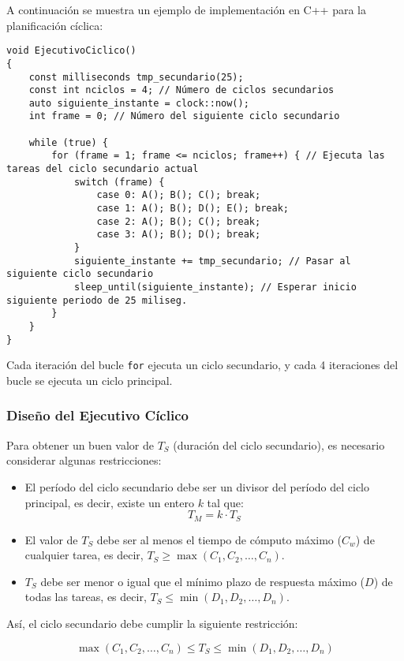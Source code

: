 \documentclass[a4paper,12pt]{article}
\begin{document}
A continuación se muestra un ejemplo de implementación en C++ para la planificación cíclica:

\begin{lstlisting}[style=customcpp]
void EjecutivoCiclico()
{
    const milliseconds tmp_secundario(25);
    const int nciclos = 4; // Número de ciclos secundarios
    auto siguiente_instante = clock::now();
    int frame = 0; // Número del siguiente ciclo secundario

    while (true) {
        for (frame = 1; frame <= nciclos; frame++) { // Ejecuta las tareas del ciclo secundario actual
            switch (frame) {
                case 0: A(); B(); C(); break;
                case 1: A(); B(); D(); E(); break;
                case 2: A(); B(); C(); break;
                case 3: A(); B(); D(); break;
            }
            siguiente_instante += tmp_secundario; // Pasar al siguiente ciclo secundario
            sleep_until(siguiente_instante); // Esperar inicio siguiente periodo de 25 miliseg.
        }
    }
}
\end{lstlisting}

Cada iteración del bucle \texttt{for} ejecuta un ciclo secundario, y cada 4 iteraciones del bucle se ejecuta un ciclo principal.

\subsubsection{Diseño del Ejecutivo Cíclico}

Para obtener un buen valor de \(T_S\) (duración del ciclo secundario), es necesario considerar algunas restricciones:

\begin{itemize}
    \item El período del ciclo secundario debe ser un divisor del período del ciclo principal, es decir, existe un entero \(k\) tal que: 
    \[
    T_M = k \cdot T_S
    \]
    \item El valor de \(T_S\) debe ser al menos el tiempo de cómputo máximo (\(C_w\)) de cualquier tarea, es decir, \(T_S \geq \max(C_1, C_2, \dots, C_n)\).
    \item \(T_S\) debe ser menor o igual que el mínimo plazo de respuesta máximo (\(D\)) de todas las tareas, es decir, \(T_S \leq \min(D_1, D_2, \dots, D_n)\).
\end{itemize}

Así, el ciclo secundario debe cumplir la siguiente restricción:

\[
\max(C_1, C_2, \dots, C_n) \leq T_S \leq \min(D_1, D_2, \dots, D_n)
\]
\end{document}
